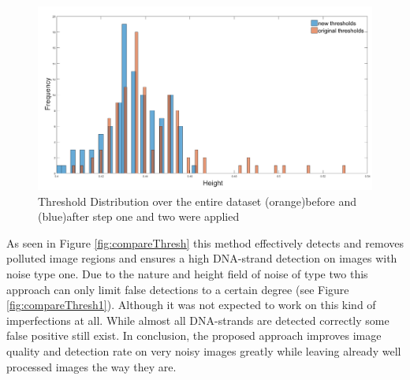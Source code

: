 \documentclass{article}
\begin{document}
\begin{figure}[!htb]
	\includegraphics[width=1\linewidth]{thresholds.png}
	\caption{Threshold Distribution over the entire dataset (orange)before and (blue)after step one and two were applied}%
	\label{fig:HistogramThresholds}
	\end{figure}
	As seen in Figure \ref{fig:compareThresh} this method effectively detects and removes polluted image regions and ensures a high DNA-strand detection on images with noise type one.
Due to the nature and height field of noise of type two this approach can only limit false detections to a certain degree (see Figure \ref{fig:compareThresh1}).
Although it was not expected to work on this kind of imperfections at all. While almost all DNA-strands are detected correctly some false positive still exist.
In conclusion, the proposed approach improves image quality and detection rate on very noisy images greatly while leaving already well processed images the way they are.
\end{document}
